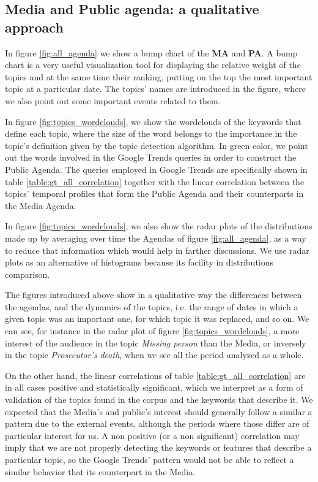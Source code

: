 \documentclass{bmcart}
\begin{document}
\subsection*{Media and Public agenda: a qualitative approach}

\par In figure \ref{fig:all_agenda} we show a bump chart of the \textbf{MA} and \textbf{PA}. A bump chart is a very useful visualization tool for displaying the relative weight of the topics and at the same time their ranking, putting on the top the most important topic at a particular date. 
The topics' names are introduced in the figure, where we also point out some important events related to them.
\par In figure \ref{fig:topics_wordclouds}, we show the wordclouds of the keywords that define each topic, where the size of the word belongs to the importance in the topic's definition given by the topic detection algorithm. In green color, we point out the words involved in the Google Trends queries in order to construct the Public Agenda. The queries employed in Google Trends are specifically shown in table \ref{table:gt_all_correlation} together with the linear correlation between the topics' temporal profiles that form the Public Agenda and their counterparts in the Media Agenda.
\par In figure \ref{fig:topics_wordclouds}, we also show the radar plots of the distributions made up by averaging over time the Agendas of figure \ref{fig:all_agenda}, as a way to reduce that information which would help in farther discussions. We use radar plots as an alternative of histograms because its facility in distributions comparison.

\par The figures introduced above show in a qualitative way the differences between the agendas, and the dynamics of the topics, i.e. the range of dates in which a given topic was an important one, for which topic it was replaced, and so on. We can see, for instance in the radar plot of figure \ref{fig:topics_wordclouds}, a more interest of the audience in the topic \emph{Missing person} than the Media, or inversely in the topic \emph{Prosecutor's death}, when we see all the period analyzed as a whole.
\par On the other hand, the linear correlations of table \ref{table:gt_all_correlation} are in all cases positive and statistically significant, which we interpret as a form of validation of the topics found in the corpus and the keywords that describe it.
We expected that the Media's and public's interest should generally follow a similar a pattern due to the external events, although the periods where those differ are of particular interest for us.
A non positive (or a non significant) correlation may imply that we are not properly detecting the keywords or features that describe a particular topic, so the Google Trends' pattern would not be able to reflect a similar behavior that its counterpart in the Media.
\end{document}
